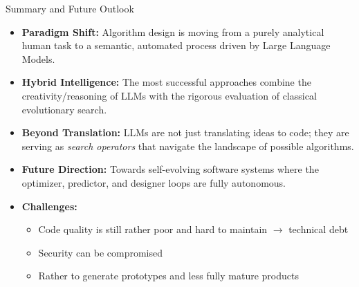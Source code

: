 \documentclass[main]{subfiles}
\begin{document}
\begin{frame}{Summary and Future Outlook}
    \begin{itemize}
        \item \textbf{Paradigm Shift:} Algorithm design is moving from a purely analytical human task to a semantic, automated process driven by Large Language Models.
        \item \textbf{Hybrid Intelligence:} The most successful approaches combine the creativity/reasoning of LLMs with the rigorous evaluation of classical evolutionary search.
        \item \textbf{Beyond Translation:} LLMs are not just translating ideas to code; they are serving as \textit{search operators} that navigate the landscape of possible algorithms.
        \item \textbf{Future Direction:} Towards self-evolving software systems where the optimizer, predictor, and designer loops are fully autonomous.
        \item \textbf{Challenges:} 
        \begin{itemize}
            \item Code quality is still rather poor and hard to maintain $\to$ technical debt
            \item Security can be compromised
            \item[$\leadsto$] Rather to generate prototypes and less fully mature products
        \end{itemize}
    \end{itemize}
\end{frame}
\end{document}
